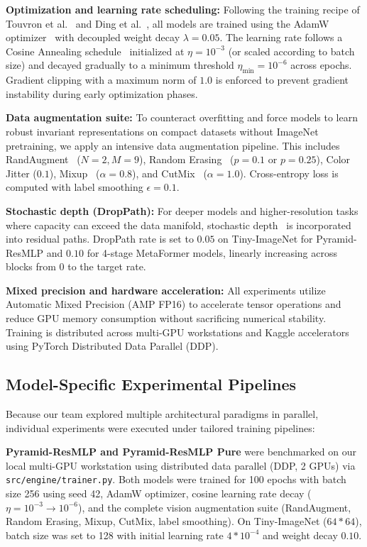 \textbf{Optimization and learning rate scheduling:} Following the training recipe of Touvron et al.~\cite{touvron2021resmlp} and Ding et al.~\cite{ding2022repmlp}, all models are trained using the AdamW optimizer~\cite{loshchilov2017adamw} with decoupled weight decay $\lambda = 0.05$. The learning rate follows a Cosine Annealing schedule~\cite{loshchilov2016sgdr} initialized at $\eta = 10^{-3}$ (or scaled according to batch size) and decayed gradually to a minimum threshold $\eta_{\text{min}} = 10^{-6}$ across epochs. Gradient clipping with a maximum norm of $1.0$ is enforced to prevent gradient instability during early optimization phases.

\textbf{Data augmentation suite:} To counteract overfitting and force models to learn robust invariant representations on compact datasets without ImageNet pretraining, we apply an intensive data augmentation pipeline. This includes RandAugment~\cite{cubuk2020randaugment} ($N=2, M=9$), Random Erasing~\cite{zhong2020random} ($p=0.1$ or $p=0.25$), Color Jitter ($0.1$), Mixup~\cite{zhang2017mixup} ($\alpha=0.8$), and CutMix~\cite{yun2019cutmix} ($\alpha=1.0$). Cross-entropy loss is computed with label smoothing $\epsilon = 0.1$.

\textbf{Stochastic depth (DropPath):} For deeper models and higher-resolution tasks where capacity can exceed the data manifold, stochastic depth~\cite{huang2016deep} is incorporated into residual paths. DropPath rate is set to $0.05$ on Tiny-ImageNet for Pyramid-ResMLP and $0.10$ for 4-stage MetaFormer models, linearly increasing across blocks from 0 to the target rate.

\textbf{Mixed precision and hardware acceleration:} All experiments utilize Automatic Mixed Precision (AMP FP16) to accelerate tensor operations and reduce GPU memory consumption without sacrificing numerical stability. Training is distributed across multi-GPU workstations and Kaggle accelerators using PyTorch Distributed Data Parallel (DDP).

\subsection{Model-Specific Experimental Pipelines}
\label{subsection:member_pipelines}

Because our team explored multiple architectural paradigms in parallel, individual experiments were executed under tailored training pipelines:

\textbf{Pyramid-ResMLP and Pyramid-ResMLP Pure} were benchmarked on our local multi-GPU workstation using distributed data parallel (DDP, 2 GPUs) via \texttt{src/engine/trainer.py}. Both models were trained for 100 epochs with batch size 256 using seed 42, AdamW optimizer, cosine learning rate decay ($\eta = 10^{-3} \rightarrow 10^{-6}$), and the complete vision augmentation suite (RandAugment, Random Erasing, Mixup, CutMix, label smoothing). On Tiny-ImageNet ($64*64$), batch size was set to 128 with initial learning rate $4*10^{-4}$ and weight decay $0.10$.

